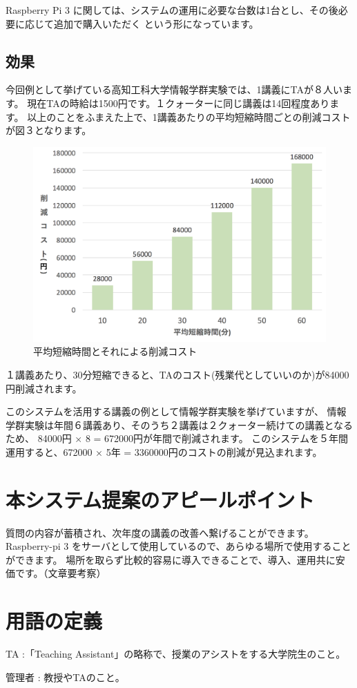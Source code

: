\documentclass[a4j,titlepage]{ujarticle}
\begin{document}
Raspberry Pi 3 に関しては、システムの運用に必要な台数は1台とし、その後必要に応じて追加で購入いただく
という形になっています。

\subsection{効果}
今回例として挙げている高知工科大学情報学群実験では、1講義にTAが８人います。
現在TAの時給は1500円です。１クォーターに同じ講義は14回程度あります。
以上のことをふまえた上で、1講義あたりの平均短縮時間ごとの削減コストが図３となります。
\begin{figure}[h]

\centering
   \includegraphics[width=13cm]{sisan.png}
  \caption{平均短縮時間とそれによる削減コスト}
\end{figure}


１講義あたり、30分短縮できると、TAのコスト(残業代としていいのか)が84000円削減されます。


このシステムを活用する講義の例として情報学群実験を挙げていますが、
情報学群実験は年間６講義あり、そのうち２講義は２クォーター続けての講義となるため、 84000円 × 8 = 672000円が年間で削減されます。
このシステムを５年間運用すると、672000 × 5年 = 3360000円のコストの削減が見込まれます。

\section{本システム提案のアピールポイント}
質問の内容が蓄積され、次年度の講義の改善へ繋げることができます。
Raspberry-pi 3 をサーバとして使用しているので、あらゆる場所で使用することができます。
場所を取らず比較的容易に導入できることで、導入、運用共に安価です。（文章要考察）


\section{用語の定義}
TA :「Teaching Assistant」の略称で、授業のアシストをする大学院生のこと。

管理者 : 教授やTAのこと。




\newpage
\end{document}

